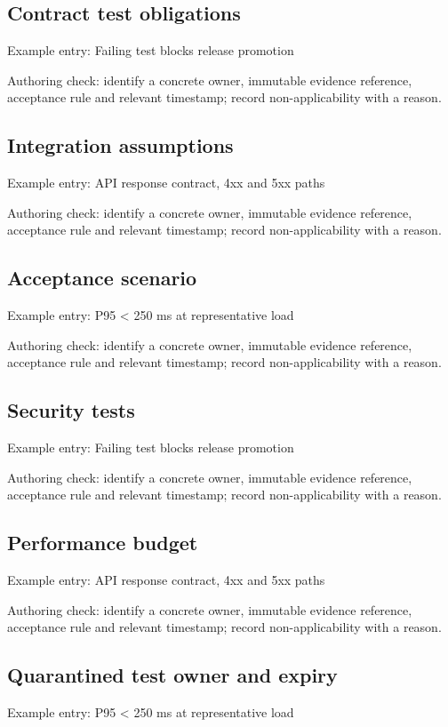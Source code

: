 \documentclass[10pt,letterpaper]{article}
\begin{document}
\subsection{Contract test obligations}
Example entry: Failing test blocks release promotion

Authoring check: identify a concrete owner, immutable evidence reference, acceptance rule and relevant timestamp; record non-applicability with a reason.


\subsection{Integration assumptions}
Example entry: API response contract, 4xx and 5xx paths

Authoring check: identify a concrete owner, immutable evidence reference, acceptance rule and relevant timestamp; record non-applicability with a reason.


\subsection{Acceptance scenario}
Example entry: P95 < 250 ms at representative load

Authoring check: identify a concrete owner, immutable evidence reference, acceptance rule and relevant timestamp; record non-applicability with a reason.


\subsection{Security tests}
Example entry: Failing test blocks release promotion

Authoring check: identify a concrete owner, immutable evidence reference, acceptance rule and relevant timestamp; record non-applicability with a reason.


\subsection{Performance budget}
Example entry: API response contract, 4xx and 5xx paths

Authoring check: identify a concrete owner, immutable evidence reference, acceptance rule and relevant timestamp; record non-applicability with a reason.


\subsection{Quarantined test owner and expiry}
Example entry: P95 < 250 ms at representative load
\end{document}
